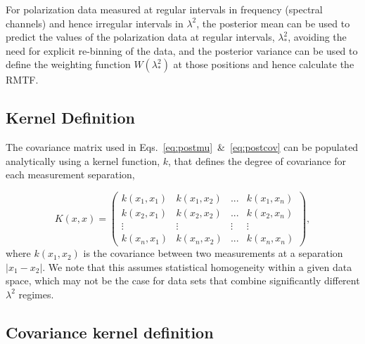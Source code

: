 \documentclass[fleqn,usenatbib]{mnras}
\begin{document}
For polarization data measured at regular intervals in frequency (spectral channels) and hence irregular intervals in $\lambda^2$, the posterior mean can be used to predict the values of the polarization data at regular intervals, $\lambda_{\ast}^2$, avoiding the need for explicit re-binning of the data, and the posterior variance can be used to define the weighting function $W(\lambda_{\ast}^2)$ at those positions and hence calculate the RMTF.

\subsection{Kernel Definition}

The covariance matrix used in Eqs.~\ref{eq:postmu}~\&~\ref{eq:postcov} can be populated analytically using a kernel function, $k$, that defines the degree of covariance for each measurement separation,

\begin{equation}
K(x,x) = \left(
\begin{array}{cccc}
k(x_1,x_1) & k(x_1,x_2) & ... & k(x_1,x_n) \\
k(x_2,x_1) & k(x_2,x_2) & ... & k(x_2,x_n) \\
\vdots & \vdots & \vdots & \vdots \\
k(x_n,x_1) & k(x_n,x_2) & ... & k(x_n,x_n)
\end{array}
\right),
\end{equation}
%
where $k(x_1,x_2)$ is the covariance between two measurements at a separation $|x_1 - x_2|$. We note that this assumes statistical homogeneity within a given data space, which may not be the case for data sets that combine significantly different $\lambda^2$ regimes.

%
%


\subsection{Covariance kernel definition}
\label{sec:kernels}
\end{document}
